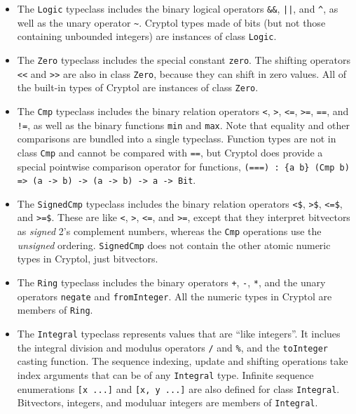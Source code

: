 \begin{itemize}
\item
The \texttt{Logic} typeclass includes the binary logical operators
\texttt{\&\&}, \texttt{||}, and \verb+^+, as well as the unary
operator \verb+~+. Cryptol types made of bits (but not those
containing unbounded integers) are instances of class \texttt{Logic}.

\item
The \texttt{Zero} typeclass includes the special constant
\texttt{zero}. The shifting operators \texttt{<<} and \texttt{>>} are
also in class \texttt{Zero}, because they can shift in zero values.
All of the built-in types of Cryptol are instances of class
\texttt{Zero}.

\item
The \texttt{Cmp} typeclass includes the binary relation operators
\texttt{<}, \texttt{>}, \texttt{<=}, \texttt{>=}, \texttt{==}, and
\texttt{!=}, as well as the binary functions \texttt{min} and
\texttt{max}. Note that equality and other comparisons are bundled
into a single typeclass. Function types are not in class \texttt{Cmp}
and cannot be compared with \texttt{==}, but Cryptol does provide a
special pointwise comparison operator for functions, \texttt{(===) :
  \{a b\} (Cmp b) => (a -> b) -> (a -> b) -> a -> Bit}.

\item
The \texttt{SignedCmp} typeclass includes the binary relation
operators \texttt{<\$}, \texttt{>\$}, \texttt{<=\$}, and
\texttt{>=\$}. These are like \texttt{<}, \texttt{>}, \texttt{<=}, and
\texttt{>=}, except that they interpret bitvectors as \emph{signed}
2's complement numbers, whereas the \texttt{Cmp} operations use the
\emph{unsigned} ordering. \texttt{SignedCmp} does not contain the
other atomic numeric types in Cryptol, just bitvectors.

\item
The \texttt{Ring} typeclass includes the binary operators \texttt{+},
\texttt{-}, \texttt{*}, and the unary operators \texttt{negate}
and \texttt{fromInteger}.  All the numeric types in Cryptol
are members of \texttt{Ring}.

\item
The \texttt{Integral} typeclass represents values that are ``like
integers''.  It inclues the integral division and modulus operators
\texttt{/} and \texttt{\%}, and the \texttt{toInteger} casting function.
The sequence indexing, update and shifting operations
take index arguments that can be of any \texttt{Integral} type.
Infinite sequence enumerations \texttt{[x ...]}
and \texttt{[x, y ...]} are also defined for class \texttt{Integral}.
Bitvectors, integers, and moduluar integers are members of \texttt{Integral}.


\end{itemize}
